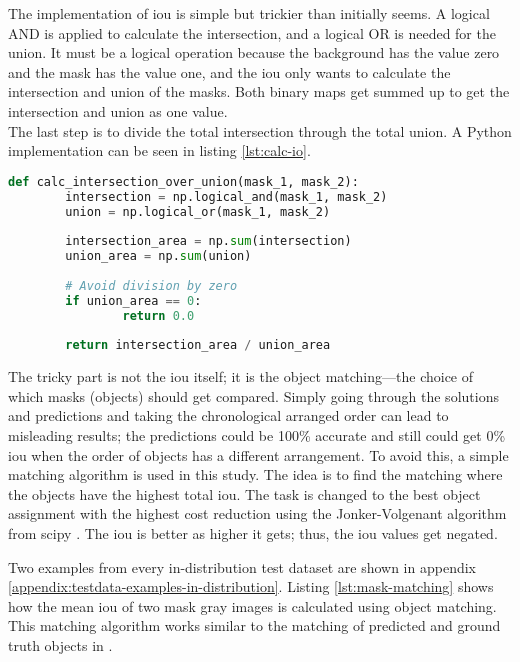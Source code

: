 		\clearpage
		The implementation of \ac{iou} is simple but trickier than initially seems. A logical AND is applied to calculate the intersection, and a logical OR is needed for the union. It must be a logical operation because the background has the value zero and the mask has the value one, and the \ac{iou} only wants to calculate the intersection and union of the masks. Both binary maps get summed up to get the intersection and union as one value. \\
		The last step is to divide the total intersection through the total union. A Python implementation can be seen in listing \ref{lst:calc-io}.
		\begin{lstlisting}[language=Python,caption=Calculate the \acl{iou} between two single masks, label=lst:calc-io]
def calc_intersection_over_union(mask_1, mask_2):
		intersection = np.logical_and(mask_1, mask_2)
		union = np.logical_or(mask_1, mask_2)
		
		intersection_area = np.sum(intersection)
		union_area = np.sum(union)
		
		# Avoid division by zero
		if union_area == 0:
				return 0.0
		
		return intersection_area / union_area
		\end{lstlisting}
		
		The tricky part is not the \ac{iou} itself; it is the object matching—the choice of which masks (objects) should get compared. Simply going through the solutions and predictions and taking the chronological arranged order can lead to misleading results; the predictions could be 100\% accurate and still could get 0\% \ac{iou} when the order of objects has a different arrangement. To avoid this, a simple matching algorithm is used in this study. The idea is to find the matching where the objects have the highest total \ac{iou}. The task is changed to the best object assignment with the highest cost reduction using the Jonker-Volgenant algorithm \cite{Jonker1987} from scipy \cite{scipy}. The \ac{iou} is better as higher it gets; thus, the \ac{iou} values get negated. 
		
		Two examples from every in-distribution test dataset are shown in appendix \ref{appendix:testdata-examples-in-distribution}.
		\clearpage
		Listing \ref{lst:mask-matching} shows how the mean \ac{iou} of two mask gray images is calculated using object matching. This matching algorithm works similar to the matching of predicted and ground truth objects in \cite{Xiang2021}.
		
